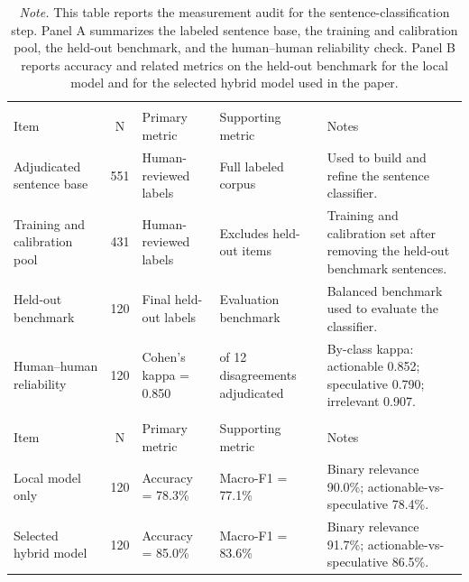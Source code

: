\begin{table}[!htbp]
\centering
\small
\caption{Measurement audit of the disclosure-classification layer}
\label{tab:appendix_audit}
\begin{tabular}{>{\raggedright\arraybackslash}p{2.8cm}c>{\raggedright\arraybackslash}p{2.8cm}>{\raggedright\arraybackslash}p{2.8cm}>{\raggedright\arraybackslash}p{5.4cm}}
\hline
\multicolumn{5}{l}{\textit{Panel A. Human labeling and validation}} \\
Item & N & Primary metric & Supporting metric & Notes \\
Adjudicated sentence base & 551 & Human-reviewed labels & Full labeled corpus & Used to build and refine the sentence classifier. \\
Training and calibration pool & 431 & Human-reviewed labels & Excludes held-out items & Training and calibration set after removing the held-out benchmark sentences. \\
Held-out benchmark & 120 & Final held-out labels & Evaluation benchmark & Balanced benchmark used to evaluate the classifier. \\
Human--human reliability & 120 & Cohen's kappa = 0.850 & 12 of 12 disagreements adjudicated & By-class kappa: actionable 0.852; speculative 0.790; irrelevant 0.907. \\
\multicolumn{5}{l}{\textit{Panel B. Classifier evaluation on the held-out benchmark}} \\
Item & N & Primary metric & Supporting metric & Notes \\
Local model only & 120 & Accuracy = 78.3\% & Macro-F1 = 77.1\% & Binary relevance 90.0\%; actionable-vs-speculative 78.4\%. \\
Selected hybrid model & 120 & Accuracy = 85.0\% & Macro-F1 = 83.6\% & Binary relevance 91.7\%; actionable-vs-speculative 86.5\%. \\
\hline
\end{tabular}
\caption*{\footnotesize \textit{Note.} This table reports the measurement audit for the sentence-classification step. Panel A summarizes the labeled sentence base, the training and calibration pool, the held-out benchmark, and the human--human reliability check. Panel B reports accuracy and related metrics on the held-out benchmark for the local model and for the selected hybrid model used in the paper.}
\end{table}
